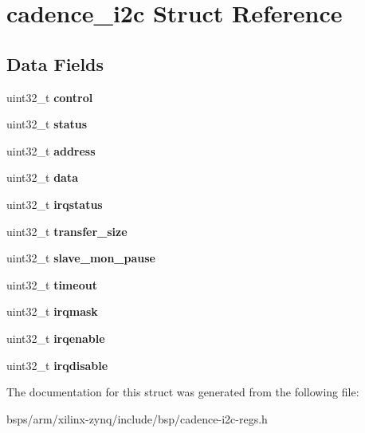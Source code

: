 \hypertarget{structcadence__i2c}{}\section{cadence\+\_\+i2c Struct Reference}
\label{structcadence__i2c}
\subsection*{Data Fields}
\begin{DoxyCompactItemize}
\item 
\mbox{\label{structcadence__i2c_a8be9f80bd0ece624264dee616572aba9}} 
uint32\+\_\+t {\bfseries control}
\item 
\mbox{\label{structcadence__i2c_ab39e0638a9532c41e174f57de2980604}} 
uint32\+\_\+t {\bfseries status}
\item 
\mbox{\label{structcadence__i2c_a92e9595000b14378ded14eb6fa8b9566}} 
uint32\+\_\+t {\bfseries address}
\item 
\mbox{\label{structcadence__i2c_a2bf602170f95f9528943e52e34e75435}} 
uint32\+\_\+t {\bfseries data}
\item 
\mbox{\label{structcadence__i2c_a04a2ec79b680f02b6ff9d4535000b7f4}} 
uint32\+\_\+t {\bfseries irqstatus}
\item 
\mbox{\label{structcadence__i2c_a4fa91293efe4d8f6488a61e2dfd6dc77}} 
uint32\+\_\+t {\bfseries transfer\+\_\+size}
\item 
\mbox{\label{structcadence__i2c_acdcce40669e79bc1986f5865775ce362}} 
uint32\+\_\+t {\bfseries slave\+\_\+mon\+\_\+pause}
\item 
\mbox{\label{structcadence__i2c_a4f686fcc704431d3920400068f2e844e}} 
uint32\+\_\+t {\bfseries timeout}
\item 
\mbox{\label{structcadence__i2c_a3b536a97e1d273450077767ca62e453a}} 
uint32\+\_\+t {\bfseries irqmask}
\item 
\mbox{\label{structcadence__i2c_ae0f9701bff6c0f4349ca88ba543b7b0e}} 
uint32\+\_\+t {\bfseries irqenable}
\item 
\mbox{\label{structcadence__i2c_aac80bee083f365e34f87cbd16217b7bf}} 
uint32\+\_\+t {\bfseries irqdisable}
\end{DoxyCompactItemize}


The documentation for this struct was generated from the following file\+:\begin{DoxyCompactItemize}
\item 
bsps/arm/xilinx-\/zynq/include/bsp/cadence-\/i2c-\/regs.\+h\end{DoxyCompactItemize}
